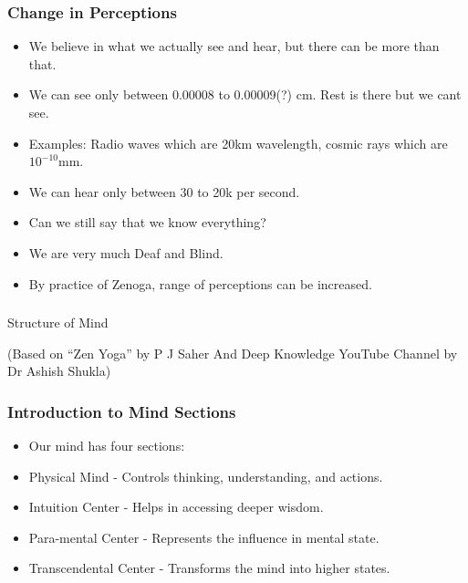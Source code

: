 \begin{frame}[fragile]\frametitle{Change in Perceptions}

\begin{itemize}
\item We believe in what we actually see and hear, but there can be more than that.
\item We can see only between 0.00008 to 0.00009(?) cm. Rest is there but we cant see.
\item Examples: Radio waves which are 20km wavelength, cosmic rays which are $10^{-10}$mm.
\item We can hear only between 30 to 20k per second.
\item Can we still say that we know everything?
\item We are very much Deaf and Blind.
\item By practice of Zenoga, range of perceptions can be increased.
\end{itemize}

\end{frame}

\begin{frame}[fragile]\frametitle{}
\begin{center}
{\Large Structure of Mind}


{\tiny (Based on ``Zen Yoga'' by P J Saher And Deep Knowledge YouTube Channel by Dr Ashish Shukla)}
\end{center}
\end{frame}


\begin{frame}[fragile]\frametitle{Introduction to Mind Sections}
\begin{itemize}
    \item Our mind has four sections: 
    \item Physical Mind - Controls thinking, understanding, and actions.
    \item Intuition Center - Helps in accessing deeper wisdom.
    \item Para-mental Center - Represents the influence in mental state.
    \item Transcendental Center - Transforms the mind into higher states.
\end{itemize}
\end{frame}

